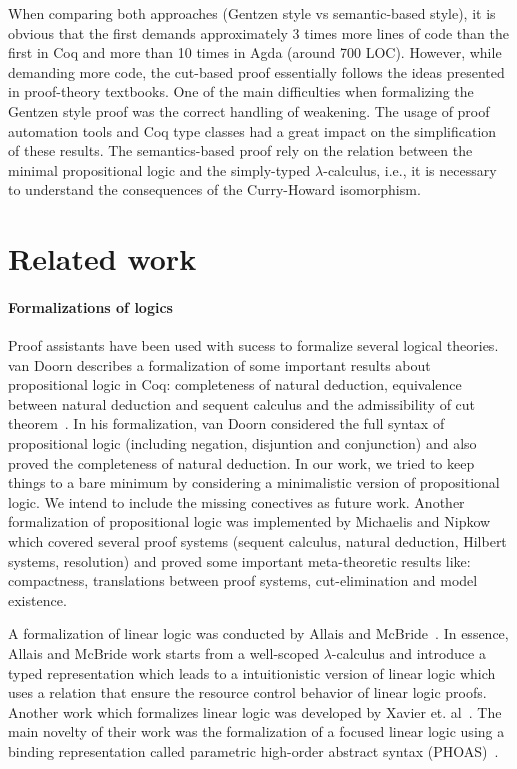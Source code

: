 When comparing both approaches (Gentzen style vs semantic-based style), it is obvious that the
first demands approximately 3 times more lines of code than the first in Coq and more than 10
times in Agda (around 700 LOC).
However, while demanding more code, the cut-based proof essentially follows the ideas presented in
proof-theory textbooks. One of the main difficulties when formalizing the Gentzen style proof was the correct handling of
weakening. The usage of proof automation tools and Coq type classes had a great impact
on the simplification of these results.
The semantics-based proof rely on the relation between the minimal propositional logic and
the simply-typed $\lambda$-calculus, i.e., it is necessary to understand the consequences
of the Curry-Howard isomorphism.


\section{Related work}\label{sec:related}


\paragraph{Formalizations of logics}Proof assistants have been used with sucess to formalize
several logical theories. van Doorn describes a formalization of some important results about
propositional logic in Coq: completeness of natural deduction, equivalence between natural
deduction and sequent calculus and the admissibility of cut theorem~\cite{doorn2015}. In his formalization,
van Doorn considered the full syntax of propositional logic (including negation, disjuntion and conjunction) and
also proved the completeness of natural deduction. In our work, we tried to keep things to a bare minimum by
considering a minimalistic version of propositional logic. We intend to include the missing conectives as
future work. Another formalization of propositional logic was implemented by Michaelis and Nipkow~\cite{Nipkow17} which
covered several proof systems (sequent calculus, natural deduction, Hilbert systems, resolution) and proved some
important meta-theoretic results like: compactness, translations between proof systems, cut-elimination and model existence.


A formalization of linear logic was conducted by Allais and McBride~\cite{allais18}. In essence, Allais and McBride work
starts from a well-scoped $\lambda$-calculus and introduce a typed representation which leads to a intuitionistic version
of linear logic which uses a relation that ensure the resource control behavior of linear logic proofs. Another work which
formalizes linear logic was developed by Xavier et. al~\cite{xavier18}. The main novelty of their work was the formalization
of a focused linear logic using a binding representation called parametric high-order abstract syntax (PHOAS)~\cite{Chlipala08}.


